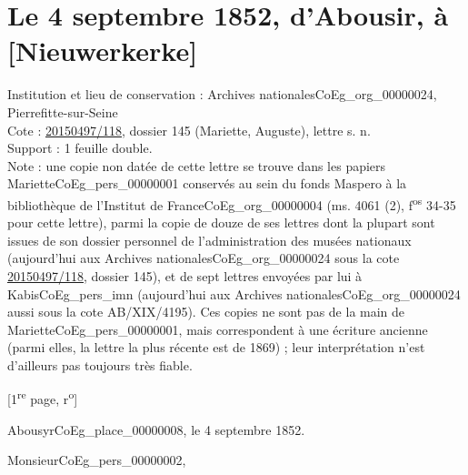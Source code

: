 \documentclass{book}
\begin{document}
\section*{Le 4 septembre 1852, d'Abousir, à [Nieuwerkerke]} \label{CoEg_Mariette_1852-09-04} 
{\footnotesize \noindent Institution et lieu de conservation : Archives nationales\gls{CoEg_org_00000024}, Pierrefitte-sur-Seine\\
Cote : \hyperref[CoEg_Mariette_ms_001]{20150497/118}, dossier 145 (Mariette, Auguste), lettre s. n.\\
Support : 1 feuille double.\\
Note : une copie non datée de cette lettre se trouve dans les papiers Mariette\gls{CoEg_pers_00000001} conservés au sein du fonds Maspero à la bibliothèque de l'Institut de France\gls{CoEg_org_00000004} (ms. 4061 (2), f\textsuperscript{os} 34-35 pour cette lettre), parmi la copie de douze de ses lettres dont la plupart sont issues de son dossier personnel de l'administration des musées nationaux (aujourd'hui aux Archives nationales\gls{CoEg_org_00000024} sous la cote \hyperref[CoEg_Mariette_ms_001]{20150497/118}, dossier 145), et de sept lettres envoyées par lui à Kabis\gls{CoEg_pers_imn} (aujourd'hui aux Archives nationales\gls{CoEg_org_00000024} aussi sous la cote AB/XIX/4195). Ces copies ne sont pas de la main de Mariette\gls{CoEg_pers_00000001}, mais correspondent à une écriture ancienne (parmi elles, la lettre la plus récente est de 1869) ; leur interprétation n'est d'ailleurs pas toujours très fiable.
\begin{center} {[1\textsuperscript{re} page, r\textsuperscript{o}]}\end{center}}
\begin{flushright}Abousyr\gls{CoEg_place_00000008}, le 4 septembre 1852.\end{flushright}

\hspace{1cm} Monsieur\gls{CoEg_pers_00000002},\\
\end{document}
